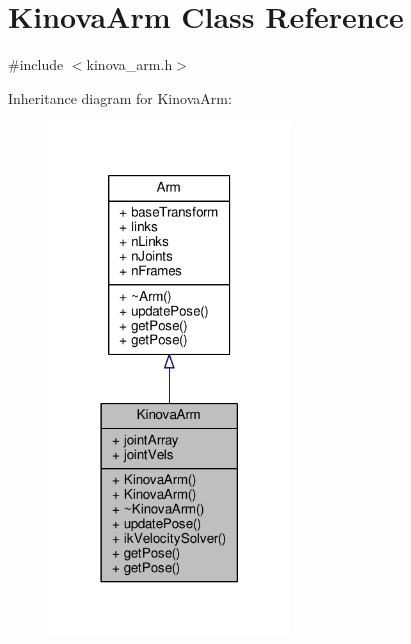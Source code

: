 \hypertarget{class_kinova_arm}{}\section{Kinova\+Arm Class Reference}
\label{class_kinova_arm}


{\ttfamily \#include $<$kinova\+\_\+arm.\+h$>$}



Inheritance diagram for Kinova\+Arm\+:\nopagebreak
\begin{figure}[H]
\begin{center}
\leavevmode
\includegraphics[width=182pt]{class_kinova_arm__inherit__graph}
\end{center}
\end{figure}


